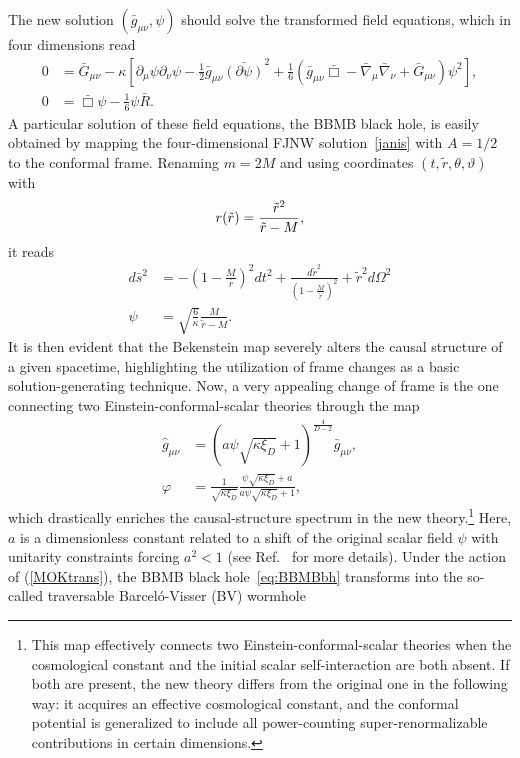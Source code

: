 \documentclass[aps,preprint,groupedaddress,nofootinbib,superscriptaddress,showkeys,showpacs,eqsecnum,amsmath,amssymb]{revtex4-1}
\begin{document}
The new solution $(\bar{g}_{\mu\nu},\psi)$ should solve the transformed field equations, which in four dimensions read
\begin{subequations}
\begin{align}
0&=\bar{G}_{\mu\nu}-\kappa\left[\partial_\mu\psi\partial_\nu\psi-\frac{1}{2}\bar{g}_{\mu\nu}\bar{(\partial \psi)}^2+\frac{1}{6}\left(\bar g_{\mu\nu}\bar{\Box}-\bar{\nabla}_\mu\bar{\nabla}_\nu+\bar{G}_{\mu\nu}\right)\psi^2\right],\\
0&=\bar{\Box}\psi-\frac{1}{6}\psi\bar{R}.
\end{align}
\end{subequations}
A particular solution of these field equations, the BBMB black hole, is easily obtained by mapping the four-dimensional FJNW solution~\eqref{janis} with $A=1/2$ to the conformal frame. Renaming $m=2M$ and using coordinates $(t,\tilde{r},\theta,\vartheta)$ with
\begin{equation}
    r(\Tilde{r})= \frac{\tilde{r}^2}{\tilde{r}-M},
\end{equation}
it reads  
\begin{subequations}
\label{eq:BBMBbh}
\begin{align}
d\bar{s}^2&=-\left(1-\frac{M}{\bar r}\right)^2dt^2+\frac{d\tilde{r}^2}{\left(1-\frac{M}{\tilde{r}}\right)^2}+\tilde{r}^2d\Omega^2\\
\psi&=\sqrt{\frac{6}{\kappa}}\frac{M}{\tilde{r}-M}.
\end{align}
\end{subequations}
It is then evident that the Bekenstein map severely alters the causal structure of a given spacetime, highlighting the utilization of frame changes as a basic solution-generating technique. 
Now, a very appealing change of frame \cite{Ayon-Beato:2015ada} is the one connecting two Einstein-conformal-scalar theories through the map
\begin{subequations}
\label{MOKtrans}
\begin{align}
\hat{g}_{\mu\nu}&=\left(a \psi \sqrt{\kappa\xi_{D}}+1\right)^{\frac{4}{D-2}}\bar{g}_{\mu\nu},\\
\varphi&=\frac{1}{\sqrt{\kappa\xi_{D}}}\frac{\psi\sqrt{\kappa\xi_{D}}+a}{a\psi\sqrt{\kappa\xi_{D}}+1}, 
\end{align}
\end{subequations}
which drastically enriches the causal-structure spectrum in the new theory.\footnote{This map effectively connects two Einstein-conformal-scalar theories when the cosmological constant and the initial scalar self-interaction are both absent. If both are present, the new theory differs from the original one in the following way: it acquires an effective cosmological constant, and the conformal potential is generalized to include all power-counting super-renormalizable contributions in certain dimensions.}  Here, $a$ is a dimensionless constant related to a shift of the original scalar field $\psi$ with unitarity constraints forcing $a^2<1$ (see Ref.~\cite{Ayon-Beato:2015ada} for more details). Under the action of (\ref{MOKtrans}), the BBMB black hole~\eqref{eq:BBMBbh} transforms into the so-called traversable Barcel\'o-Visser (BV) wormhole~\cite{Barcelo:1999hq,Barcelo:2000zf}
\end{document}
